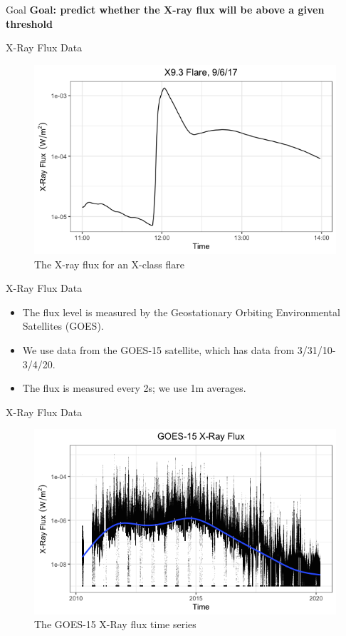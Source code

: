 \documentclass{beamer}
\begin{document}
\begin{frame}{Goal}
    \textbf{Goal: predict whether the X-ray flux will be above a given threshold}
\end{frame}

\begin{frame}{X-Ray Flux Data}
    \begin{figure}
        \centering
        \includegraphics[scale=0.5]{flare_flux_example.png}
        \caption{The X-ray flux for an X-class flare}
        \label{fig:flare_flux_example}
    \end{figure}
\end{frame}

\begin{frame}{X-Ray Flux Data}
    \begin{itemize}
        \item The flux level is measured by the Geostationary Orbiting Environmental Satellites (GOES).
        \item We use data from the GOES-15 satellite, which has data from 3/31/10-3/4/20.
        \item The flux is measured every 2s; we use 1m averages.
    \end{itemize}
\end{frame}

\begin{frame}{X-Ray Flux Data}
    \begin{figure}
        \centering
        \includegraphics[scale=0.5]{flux_time_series.png}
        \caption{The GOES-15 X-Ray flux time series}
        \label{fig:flux_time_series}
    \end{figure}
\end{frame}
\end{document}
